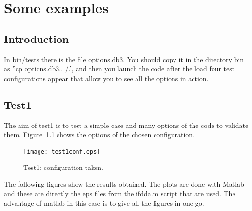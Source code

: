 \chapter{Some examples}\label{chaptest}
\minitoc

\section{Introduction}

In bin/tests there is the file options.db3. You should copy it in the
directory bin as ''cp options.db3.. /.', and then you launch the code
after the load four test configurations appear that allow you to see
all the options in action.



\section{Test1}

The aim of test1 is to test a simple case and many options of the code
to validate them. Figure~\ref{test1conf} shows the options of the
chosen configuration.

\begin{figure}[H]
\begin{center}
  \texttt{[image: test1conf.eps]}
\end{center}
\caption{Test1: configuration taken.}
\label{test1conf}
\end{figure}

The following figures show the results obtained. The plots are done
with Matlab and these are directly the eps files from the ifdda.m
script that are used. The advantage of matlab in this case is to give
all the figures in one go.

